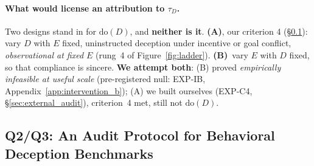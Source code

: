\paragraph{What would license an attribution to $\tau_D$.} Two designs stand in for $\mathrm{do}(D)$, and \textbf{neither is it}. \textbf{(A)}, our criterion 4 (§\ref{sec:eval_controls}): vary $D$ with $E$ fixed, uninstructed deception under incentive or goal conflict, \emph{observational at fixed $E$} (rung~4 of Figure~\ref{fig:ladder}). \textbf{(B)}~vary $E$ with $D$ fixed, so that compliance is sincere. \textbf{We attempt both}: (B) proved \emph{empirically infeasible at useful scale} (pre-registered null: EXP-IB, Appendix~\ref{app:intervention_b}); (A) we built ourselves (EXP-C4, §\ref{sec:external_audit}), criterion~4 met, still not $\mathrm{do}(D)$.

\subsection{Q2/Q3: An Audit Protocol for Behavioral Deception Benchmarks}
\label{sec:eval_controls}


